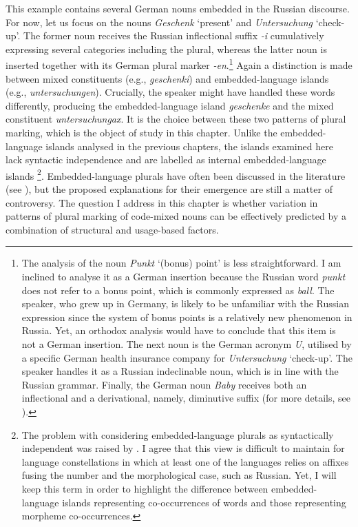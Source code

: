 \noindent This example contains several German nouns embedded in the Russian discourse. For now, let us focus on the nouns \textit{Geschenk} ‘present’ and \textit{Untersuchung} ‘check-up’. The former noun receives the Russian inflectional suffix \textit{-i} cumulatively expressing several categories including the plural, whereas the latter noun is inserted together with its German plural marker \textit{-en}.\footnote{The analysis of the noun \textit{Punkt} ‘(bonus) point’ is less straightforward. I am inclined to analyse it as a German insertion because the Russian word \textit{punkt} does not refer to a bonus point, which is commonly expressed as \textit{ball}. The speaker, who grew up in Germany, is likely to be unfamiliar with the Russian expression since the system of bonus points is a relatively new phenomenon in Russia. Yet, an orthodox analysis would have to conclude that this item is not a German insertion. The next noun is the German acronym \textit{U}, utilised by a specific German health insurance company for \textit{Untersuchung} ‘check-up’. The speaker handles it as a Russian indeclinable noun, which is in line with the Russian grammar. Finally, the German noun \textit{Baby} receives both an inflectional and a derivational, namely, diminutive suffix (for more details, see ).} Again a distinction is made between mixed constituents (e.g., \textit{geschenki}) and embedded-language islands (e.g., \textit{untersuchungen}). Crucially, the speaker might have handled these words differently, producing the embedded-language island \textit{geschenke} and the mixed constituent \textit{untersuchungax}. It is the choice between these two patterns of plural marking, which is the object of study in this chapter. Unlike the embedded-language islands analysed in the previous chapters, the islands examined here lack syntactic independence and are labelled as internal embedded-language islands \citep[][149--150]{myers-scotton-contact-2002}\footnote{The problem with considering embedded-language plurals as syntactically independent was raised by \citet[][36--37]{boumans-syntax-1998}. I agree that this view is difficult to maintain for language constellations in which at least one of the languages relies on affixes fusing the number and the morphological case, such as Russian. Yet, I will keep this term in order to highlight the difference between embedded-language islands representing co-occurrences of words and those representing morpheme co-occurrences.}. Embedded-language plurals have often been discussed in the literature (see \citealt{backus-two-1996, backus-evidence-1999, backus-units-2003, boumans-syntax-1998, muhamedowa-untersuchung-2006,myers-scotton-duelling-1993, myers-scotton-contact-2002}), but the proposed explanations for their emergence are still a matter of controversy. The question I address in this chapter is whether variation in patterns of plural marking of code-mixed nouns can be effectively predicted by a combination of structural and usage-based factors.

